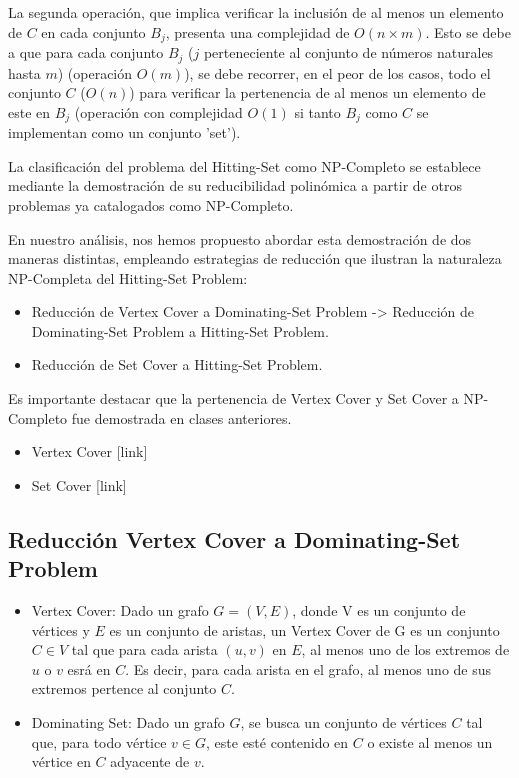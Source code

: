 La segunda operación, que implica verificar la inclusión de al menos un elemento de $C$ 
en cada conjunto $B_{j}$, presenta una complejidad de $O(n \times m)$. Esto se debe a 
que para cada conjunto $B_{j}$ ($j$ perteneciente al conjunto de números naturales hasta 
$m$) (operación $O(m)$), se debe recorrer, en el peor de los casos, todo el conjunto $C$ 
($O(n)$) para verificar la pertenencia de al menos un elemento de este en $B_{j}$ 
(operación con complejidad $O(1)$ si tanto $B_{j}$ como $C$ se implementan como un conjunto 'set').

La clasificación del problema del Hitting-Set como NP-Completo se establece mediante la demostración
de su reducibilidad polinómica a partir de otros problemas ya catalogados como NP-Completo. 

En nuestro análisis, nos hemos propuesto abordar esta demostración de dos maneras distintas, 
empleando estrategias de reducción que ilustran la naturaleza NP-Completa del Hitting-Set Problem:

\begin{itemize}
    \item Reducción de Vertex Cover a Dominating-Set Problem -> Reducción de Dominating-Set Problem a Hitting-Set Problem.
    \item Reducción de Set Cover a Hitting-Set Problem.
\end{itemize}


Es importante destacar que la pertenencia de Vertex Cover y Set Cover a NP-Completo fue demostrada en clases anteriores.
\begin{itemize}
    \item  Vertex Cover [link]
    \item Set Cover [link]
\end{itemize}


\subsection{Reducción Vertex Cover a Dominating-Set Problem}

\begin{itemize}
    \item Vertex Cover: Dado un grafo $G=(V,E)$, donde V es un conjunto de vértices y $E$ es un conjunto de aristas, un Vertex Cover de G es un conjunto $C \in V$ tal que para cada arista $(u,v)$ en $E$, al menos uno de los extremos de $u$ o $v$ esrá en $C$. Es decir, para cada arista en el grafo, al menos uno de sus extremos pertence al conjunto $C$. 
    \item Dominating Set: Dado un grafo $G$, se busca un conjunto de vértices $C$
    tal que, para todo vértice $v \in G$, este esté contenido en $C$ o existe al menos un vértice en $C$ adyacente de $v$.
\end{itemize}

